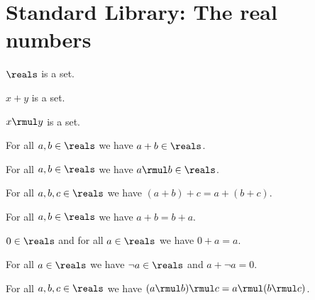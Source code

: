 \section{Standard Library: The real numbers}

\begin{signature} \label{sig1}
    $\reals$ is a set.
\end{signature}

\begin{signature} \label{sig3}
    $x + y$ is a set.
\end{signature}

\begin{signature} \label{sig4}
    $x \rmul y$ is a set.
\end{signature}

\begin{axiom}\label{real_add_closed}
    For all $a, b\in\reals$ we have $a + b\in\reals$.
\end{axiom}

\begin{axiom}\label{real_mul_closed}
    For all $a, b\in\reals$ we have $a \rmul b\in\reals$.
\end{axiom}

\begin{axiom}\label{real_add_assoc}
    For all $a, b, c\in\reals$ we have $(a + b) + c = a + (b + c)$.
\end{axiom}

\begin{axiom}\label{real_add_comm}
    For all $a, b\in\reals$ we have $a + b = b + a$.
\end{axiom}

\begin{axiom}\label{real_add_ident}
    $0\in\reals$ and for all $a\in\reals$ we have $0 + a = a$.
\end{axiom}

\begin{axiom}\label{real_add_inverse}
    For all $a\in\reals$ we have $\neg{a}\in\reals$ and $a + \neg{a} = 0$.
\end{axiom}

\begin{axiom}\label{real_mul_assoc}
    For all $a, b, c\in\reals$ we have $(a \rmul b) \rmul c = a \rmul (b \rmul c)$.
\end{axiom}

